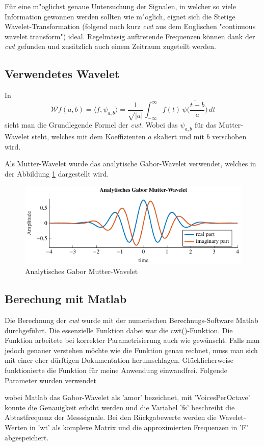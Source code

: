 \begin{refsection}
Für eine m"oglichst genaue Untersuchung der Signalen, in welcher so viele Information gewonnen werden sollten wie m"oglich, eignet sich die Stetige Wavelet-Transformation (folgend noch kurz \textit{cwt} aus dem Englischen "continuous wavelet transform")
ideal. 
Regelmässig auftretende Frequenzen können dank der \textit{cwt} gefunden und zusätzlich auch einem Zeitraum zugeteilt werden.
\subsection{Verwendetes Wavelet}
In
\begin{equation}
\mathcal{W}f (a,b)
=
\langle f,\psi_{a,b}\rangle
=
\frac{1}{\sqrt{|a|}}\int_{-\infty}^\infty f(t)\,\overline{
	\psi\biggl(\frac{t-b}{a}\biggr)}\,dt
\label{eq:cwt}
\end{equation}
sieht man die Grundlegende Formel der \textit{cwt}.
Wobei das $\psi_{a,b}$ für das Mutter-Wavelet steht, welches mit dem Koeffizienten $a$ skaliert und mit $b$ verschoben wird.

Als Mutter-Wavelet wurde das analytische Gabor-Wavelet verwendet, welches in der Abbildung \ref{fig:gabor_plot} \space dargestellt wird.
\begin{figure}
\centering
\includegraphics[width=1\textwidth]{papers/wwt/images/gabor.pdf}
\caption{Analytisches Gabor Mutter-Wavelet}
\label{fig:gabor_plot}
\end{figure}

\subsection{Berechung mit Matlab}
Die Berechnung der \textit{cwt} wurde mit der numerischen Berechnugs-Software Matlab durchgeführt.
Die essenzielle Funktion dabei war die cwt()-Funktion.
Die Funktion arbeitete bei korrekter Parametrisierung auch wie gewünscht.
Falls man jedoch genauer verstehen möchte wie die Funktion genau rechnet, muss man sich mit einer eher dürftigen Dokumentation herumschlagen.
Glücklicherweise funktionierte die Funktion für meine Anwendung einwandfrei.
Folgende Parameter wurden verwendet

\label{fig:matlab_code_cwt}
wobei Matlab das Gabor-Wavelet als 'amor' bezeichnet, mit 'VoicesPerOctave' konnte die Genauigkeit erhöht werden und die Variabel 'fs' beschreibt die Abtastfrequenz der Messsignale.
Bei den Rückgabewerte werden die Wavelet-Werten in 'wt' als komplexe Matrix und die approximierten Frequenzen in 'F' abgespeichert.


\end{refsection}
